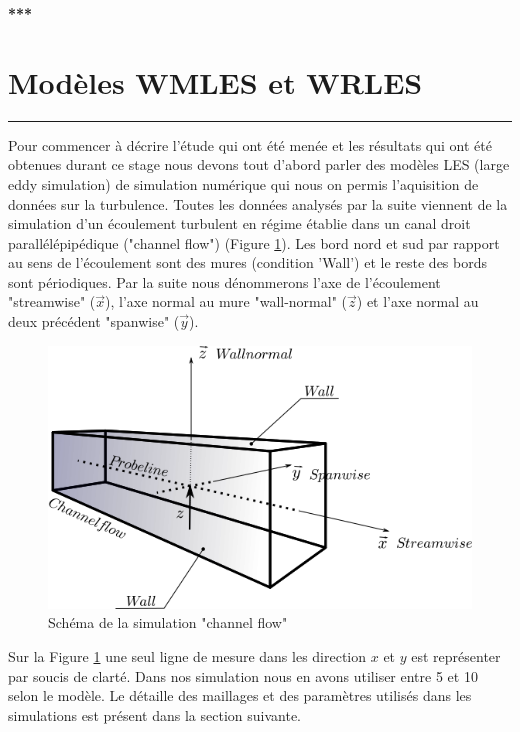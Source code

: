 \documentclass[12pt]{article}
\theoremstyle{plain}
\theoremstyle{remark}
\newcommand{\vect}{\overrightarrow}
\begin{document}
\begin{center}
	\large \bf{***}
\end{center}

\vspace{0.3cm}	
\section{Modèles WMLES et WRLES}
\noindent\rule{\linewidth}{2pt}
\vspace{0.1cm}

Pour commencer à décrire l'étude qui ont été menée et les résultats qui ont été obtenues durant ce stage nous devons tout d'abord parler des modèles LES (large eddy simulation) de simulation numérique qui nous on permis l'aquisition de données sur la turbulence. Toutes les données analysés par la suite viennent de la simulation d'un écoulement turbulent en régime établie dans un canal droit parallélépipédique ("channel flow") (Figure \ref{fig:channel_flow}). Les bord nord et sud par rapport au sens de l'écoulement sont des mures (condition 'Wall') et le reste des bords sont périodiques. Par la suite nous dénommerons l'axe de l'écoulement "streamwise" ($\vect{x}$), l'axe normal au mure "wall-normal" ($\vect{z}$) et l'axe normal au deux précédent "spanwise" ($\vect{y}$).

\begin{figure}[h!]
	\begin{center}
		\includegraphics[width=0.62\linewidth]{../../report/referance/channel_flow.png}
		\caption{Schéma de la simulation "channel flow"}
		\label{fig:channel_flow}
	\end{center}
\end{figure}

Sur la Figure \ref{fig:channel_flow} une seul ligne de mesure dans les direction $x$ et $y$ est représenter par soucis de clarté. Dans nos simulation nous en avons utiliser entre 5 et 10 selon le modèle. Le détaille des maillages et des paramètres utilisés dans les simulations est présent dans la section suivante.
\end{document}
